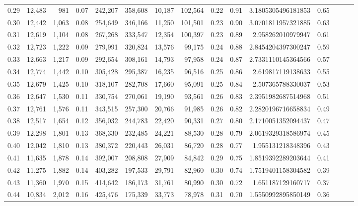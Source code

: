 \begin{tabular}{rrrrrrrrrrrrrrr}
0.29 &  12,483 &    981 &  0.07 &  242,207 &  358,608 &   10,187 &  102,564 &  0.22 &  0.91 &    3.1805305496181853 &      0.65 \\
0.30 &  12,442 &  1,063 &  0.08 &  254,649 &  346,166 &   11,250 &  101,501 &  0.23 &  0.90 &    3.0701811957321885 &      0.63 \\
0.31 &  12,619 &  1,104 &  0.08 &  267,268 &  333,547 &   12,354 &  100,397 &  0.23 &  0.89 &     2.958262010979947 &      0.61 \\
0.32 &  12,723 &  1,222 &  0.09 &  279,991 &  320,824 &   13,576 &   99,175 &  0.24 &  0.88 &    2.8454204397300247 &      0.59 \\
0.33 &  12,663 &  1,217 &  0.09 &  292,654 &  308,161 &   14,793 &   97,958 &  0.24 &  0.87 &    2.7331110145364566 &      0.57 \\
0.34 &  12,774 &  1,442 &  0.10 &  305,428 &  295,387 &   16,235 &   96,516 &  0.25 &  0.86 &     2.619817119138633 &      0.55 \\
0.35 &  12,679 &  1,425 &  0.10 &  318,107 &  282,708 &   17,660 &   95,091 &  0.25 &  0.84 &     2.507365788330037 &      0.53 \\
0.36 &  12,647 &  1,530 &  0.11 &  330,754 &  270,061 &   19,190 &   93,561 &  0.26 &  0.83 &    2.3951982687514968 &      0.51 \\
0.37 &  12,761 &  1,576 &  0.11 &  343,515 &  257,300 &   20,766 &   91,985 &  0.26 &  0.82 &    2.2820196716658834 &      0.49 \\
0.38 &  12,517 &  1,654 &  0.12 &  356,032 &  244,783 &   22,420 &   90,331 &  0.27 &  0.80 &    2.1710051352094437 &      0.47 \\
0.39 &  12,298 &  1,801 &  0.13 &  368,330 &  232,485 &   24,221 &   88,530 &  0.28 &  0.79 &    2.0619329318586974 &      0.45 \\
0.40 &  12,042 &  1,810 &  0.13 &  380,372 &  220,443 &   26,031 &   86,720 &  0.28 &  0.77 &     1.955131218348396 &      0.43 \\
0.41 &  11,635 &  1,878 &  0.14 &  392,007 &  208,808 &   27,909 &   84,842 &  0.29 &  0.75 &    1.8519392289203644 &      0.41 \\
0.42 &  11,275 &  1,882 &  0.14 &  403,282 &  197,533 &   29,791 &   82,960 &  0.30 &  0.74 &    1.7519401158304582 &      0.39 \\
0.43 &  11,360 &  1,970 &  0.15 &  414,642 &  186,173 &   31,761 &   80,990 &  0.30 &  0.72 &     1.651187129160717 &      0.37 \\
0.44 &  10,834 &  2,012 &  0.16 &  425,476 &  175,339 &   33,773 &   78,978 &  0.31 &  0.70 &    1.5550992895850149 &      0.36 \\

\end{tabular}
